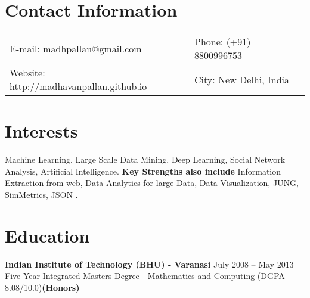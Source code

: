 \documentclass[margin,line]{res}
\begin{document}


\begin{resume}
\section{\sc Contact Information}

\vspace{.05in}
\begin{tabular}{@{}p{3.5in}p{3in}}     
{E-mail:}  madhpallan@gmail.com & {Phone:}  (+91) 8800996753   \\
{Website:} \url{http://madhavanpallan.github.io} & {City:} New Delhi, India\\
\end{tabular}


\section{\sc Interests}
Machine Learning, Large Scale Data Mining, Deep Learning, Social Network Analysis, Artificial Intelligence. {\bf Key Strengths also include} Information Extraction from web, Data Analytics for large Data, Data Visualization, JUNG, SimMetrics, JSON . %

\section{\sc Education}
{\bf Indian Institute of Technology (BHU) - Varanasi} \hfill July 2008 -- May 2013\\
Five Year Integrated Masters Degree - Mathematics and Computing \hfill(DGPA 8.08/10.0){\bf(Honors)}%


\end{resume}
\end{document}
